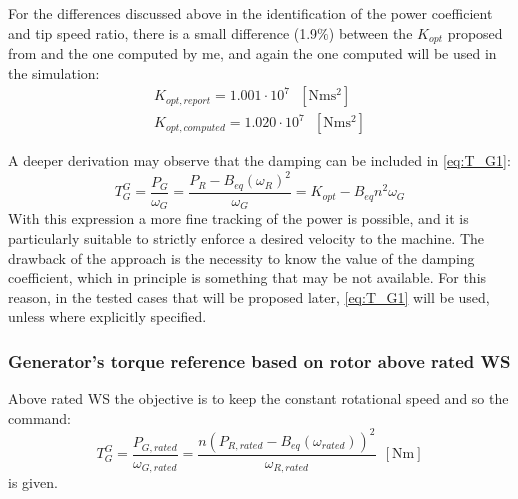  For the differences discussed above in the identification of the power coefficient and tip speed ratio, there is a small difference (1.9$\%$) between the $K_{opt}$ proposed from \cite{DTU_Wind_Energy_Report-I-0092} and the one computed by me, and again the one computed will be used in the simulation:
 \begin{gather*}
     K_{opt, report} = 1.001 \cdot 10^7 \ \ \ \left[\si{\newton\meter\square\second}\right] \\
     K_{opt, computed} = 1.020 \cdot 10^7 \ \ \ \left[\si{\newton\meter\square\second}\right] 
 \end{gather*}

 A deeper derivation may observe that the damping can be included in \autoref{eq:T_G1}:
 \begin{equation}
  T_G^{G} = \frac{P_G}{\omega_G} = \frac{P_R-B_{eq}(\omega_R)^2}{\omega_G} = K_{opt} - B_{eq}n^2\omega_G  
  \label{eq:T_G5}
 \end{equation}
 With this expression a more fine tracking of the power is possible, and it is particularly suitable to strictly enforce a desired velocity to the machine. The drawback of the approach is the necessity to know the value of the damping coefficient, which in principle is something that may be not available. For this reason, in the tested cases that will be proposed later, \autoref{eq:T_G1} will be used, unless where explicitly specified.

\subsubsection[Above WS]{Generator's torque reference based on rotor above rated WS}
Above rated WS the objective is to keep the constant rotational speed and so the command:
\begin{equation}
    T_G^{G} = \frac{P_{G,rated}}{\omega_{G,rated}} = \frac{n\left(P_{R,rated}-B_{eq}\left(\omega_{rated}\right)\right)^2}{\omega_{R,rated}}\ \ \left[\si{\newton\meter}\right]
    \label{eq:T_G3}
\end{equation}
is given.

